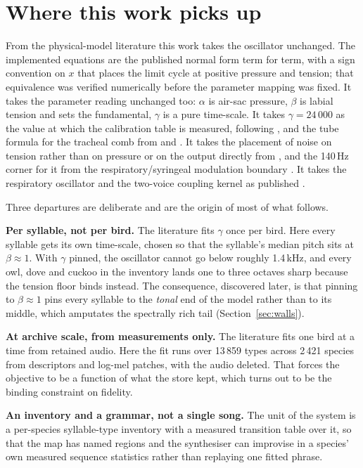 \documentclass[10pt,twocolumn,a4paper]{article}
\begin{document}
\section{Where this work picks up}
\label{sec:pickup}

From the physical-model literature this work takes the oscillator unchanged. The
implemented equations are the published normal form term for term, with a sign convention
on $x$ that places the limit cycle at positive pressure and tension; that equivalence was
verified numerically before the parameter mapping was fixed. It takes the parameter
reading unchanged too: $\alpha$ is air-sac pressure, $\beta$ is labial tension and sets the
fundamental, $\gamma$ is a pure time-scale. It takes $\gamma = 24\,000$ as the value at
which the calibration table is measured, following \citet{perl2011}, and the tube formula
for the tracheal comb from \citet{nelson2005} and \citet{riede2006}. It takes the placement
of noise on tension rather than on pressure or on the output directly from
\citet{amador2021}, and the 140\,Hz corner for it from the respiratory/syringeal modulation
boundary \citep{riedegoller2010}. It takes the respiratory oscillator and the two-voice
coupling kernel as published \citep{fainstein2025,laje2005}.

Three departures are deliberate and are the origin of most of what follows.

\textbf{Per syllable, not per bird.} The literature fits $\gamma$ once per bird. Here every
syllable gets its own time-scale, chosen so that the syllable's median pitch sits at
$\beta \approx 1$. With $\gamma$ pinned, the oscillator cannot go below roughly 1.4\,kHz,
and every owl, dove and cuckoo in the inventory lands one to three octaves sharp because
the tension floor binds instead. The consequence, discovered later, is that pinning to
$\beta \approx 1$ pins every syllable to the \emph{tonal} end of the model rather than to
its middle, which amputates the spectrally rich tail (Section~\ref{sec:walls}).

\textbf{At archive scale, from measurements only.} The literature fits one bird at a time
from retained audio. Here the fit runs over 13\,859 types across 2\,421 species from
descriptors and log-mel patches, with the audio deleted. That forces the objective to be a
function of what the store kept, which turns out to be the binding constraint on fidelity.

\textbf{An inventory and a grammar, not a single song.} The unit of the system is a
per-species syllable-type inventory with a measured transition table over it, so that the
map has named regions and the synthesiser can improvise in a species' own measured
sequence statistics rather than replaying one fitted phrase.
\end{document}
